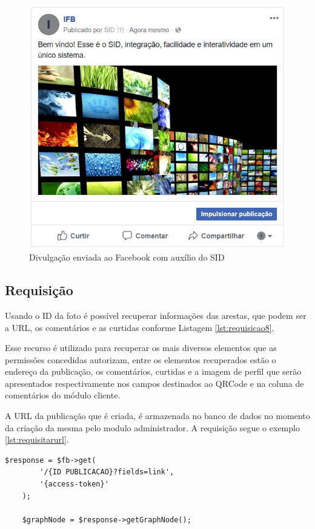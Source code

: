 \begin{figure}[H]
\centering
\includegraphics[scale=0.8]{figuras/imgfacebook1}
\caption{Divulgação enviada ao Facebook com auxílio do SID}
\label{fig:imgfacebook1}
\end{figure}


\subsection{Requisição}
Usando o ID da foto é possível recuperar informações das arestas, que podem ser a URL, os comentários e as curtidas conforme Listagem \ref{lst:requisicao8}. 

Esse recurso é utilizado para recuperar os mais diversos elementos que as permissões concedidas autorizam, entre os elementos recuperados estão o endereço da publicação, os comentários, curtidas e a imagem de perfil que serão apresentados respectivamente nos campos destinados ao QRCode e na coluna de comentários do módulo cliente.

A URL da publicação que é criada, é armazenada no banco de dados no momento da criação da mesma pelo modulo administrador. A requisição segue o exemplo \ref{lst:requisitarurl}.

\begin{lstlisting}[caption={Foto de usuário},label={lst:requisitarurl}]
  	$response = $fb->get(
    	'/{ID PUBLICACAO}?fields=link',
		'{access-token}'
	);
	
	$graphNode = $response->getGraphNode();
\end{lstlisting}

